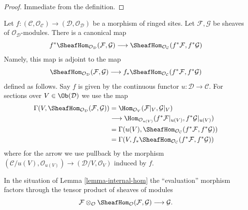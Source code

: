 \begin{proof}
Immediate from the definition.
\end{proof}

\begin{remark}
\label{remark-pullback-internal-hom}
Let $f : (\mathcal{C}, \mathcal{O}_\mathcal{C}) \to
(\mathcal{D}, \mathcal{O}_\mathcal{D})$ be a morphism
of ringed sites. Let
$\mathcal{F}, \mathcal{G}$ be sheaves of $\mathcal{O}_\mathcal{D}$-modules.
There is a canonical map
$$
f^*\SheafHom_{\mathcal{O}_\mathcal{D}}(\mathcal{F}, \mathcal{G})
\longrightarrow
\SheafHom_{\mathcal{O}_\mathcal{C}}(f^*\mathcal{F}, f^*\mathcal{G})
$$
Namely, this map is adjoint to the map
$$
\SheafHom_{\mathcal{O}_\mathcal{D}}(\mathcal{F}, \mathcal{G})
\longrightarrow
f_*\SheafHom_{\mathcal{O}_\mathcal{C}}(f^*\mathcal{F}, f^*\mathcal{G})
$$
defined as follows. Say $f$ is given by the continuous functor
$u : \mathcal{D} \to \mathcal{C}$. For sections over $V \in \Ob(\mathcal{D})$
we use the map
\begin{align*}
\Gamma(V, \SheafHom_{\mathcal{O}_\mathcal{D}}(\mathcal{F}, \mathcal{G}))
& =
\Hom_{\mathcal{O}_V}(\mathcal{F}|_V, \mathcal{G}|_V) \\
& \longrightarrow
\Hom_{\mathcal{O}_{u(V)}}(f^*\mathcal{F}|_{u(V)}, f^*\mathcal{G}|_{u(V)}) \\
& =
\Gamma(u(V), \SheafHom_{\mathcal{O}_\mathcal{C}}(f^*\mathcal{F},
f^*\mathcal{G})) \\
& =
\Gamma(V, f_*\SheafHom_{\mathcal{O}_\mathcal{C}}(f^*\mathcal{F},
f^*\mathcal{G}))
\end{align*}
where for the arrow we use pullback by the morphism
$(\mathcal{C}/u(V), \mathcal{O}_{u(V)}) \to
(\mathcal{D}/V, \mathcal{O}_V)$ induced by $f$.
\end{remark}

\noindent
In the situation of Lemma \ref{lemma-internal-hom}
the ``evaluation'' morphism
factors through the tensor product of sheaves of modules
$$
\mathcal{F}
\otimes_\mathcal{O}
\SheafHom_\mathcal{O}(\mathcal{F}, \mathcal{G})
\longrightarrow
\mathcal{G}.
$$

